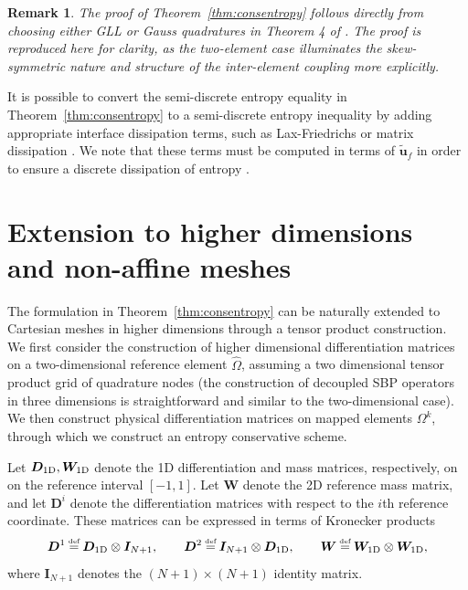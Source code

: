\documentclass[onefignum,onetabnum,final]{siamart171218}
\newtheorem*{remark}{Remark}
\renewcommand{\tilde}{\widetilde}
\renewcommand{\hat}{\widehat}
\newcommand\myeq{\mathrel{\stackrel{\makebox[0pt]{\mbox{\normalfont\tiny def}}}{=}}}
\begin{document}
\begin{remark}
The proof of Theorem~\ref{thm:consentropy} follows directly from choosing either GLL or Gauss quadratures in Theorem 4 of \cite{chan2017discretely}.  The proof is reproduced here for clarity, as the two-element case illuminates the skew-symmetric nature and structure of the inter-element coupling more explicitly.  
\end{remark}

It is possible to convert the semi-discrete entropy equality in Theorem~\ref{thm:consentropy} to a semi-discrete entropy inequality by adding appropriate interface dissipation terms, such as Lax-Friedrichs or matrix dissipation \cite{winters2017uniquely}.  We note that these terms must be computed in terms of $\tilde{\bm{u}}_f$ in order to ensure a discrete dissipation of entropy \cite{chen2017entropy, chan2017discretely}.  

\section{Extension to higher dimensions and non-affine meshes}
\label{sec:2}

The formulation in Theorem~\ref{thm:consentropy} can be naturally extended to Cartesian meshes in higher dimensions through a tensor product construction.  We first consider the construction of higher dimensional differentiation matrices on a two-dimensional reference element $\hat{\Omega}$, assuming a two dimensional tensor product grid of quadrature nodes (the construction of decoupled SBP operators in three dimensions is straightforward and similar to the two-dimensional case).  We then construct physical differentiation matrices on mapped elements $\Omega^k$, through which we construct an entropy conservative scheme.  

Let $\bm{D}_{\rm 1D}, \bm{W}_{\rm 1D}$ denote the 1D differentiation and mass matrices, respectively, on on the reference interval $[-1,1]$.  Let ${\bm{W}}$ denote the 2D reference mass matrix, and let ${\bm{D}}^i$ denote the differentiation matrices with respect to the $i$th reference coordinate.  These matrices can be expressed in terms of Kronecker products  
\[
{\bm{D}}^1 \myeq \bm{D}_{\rm 1D} \otimes \bm{I}_{N+1}, \qquad {\bm{D}}^2  \myeq \bm{I}_{N+1} \otimes \bm{D}_{\rm 1D}, \qquad {\bm{W}} \myeq \bm{W}_{\rm 1D} \otimes  \bm{W}_{\rm 1D}, 
\]
where $\bm{I}_{N+1}$ denotes the $(N+1)\times (N+1)$ identity matrix.  %
\end{document}
